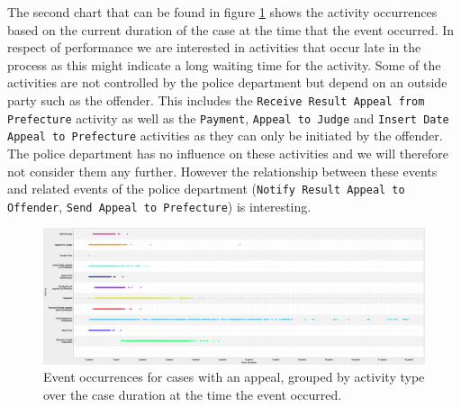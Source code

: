 \documentclass[12pt]{report}
\begin{document}
The second chart that can be found in figure \ref{fig:dotted_duration_appeals} shows the activity occurrences based on the current duration of the case at the time that the event occurred. In respect of performance we are interested in activities that occur late in the process as this might indicate a long waiting time for the activity. Some of the activities are not controlled by the police department but depend on an outside party such as the offender. This includes the \texttt{Receive Result Appeal from Prefecture} activity as well as the \texttt{Payment}, \texttt{Appeal to Judge} and \texttt{Insert Date Appeal to Prefecture} activities as they can only be initiated by the offender. The police department has no influence on these activities and we will therefore not consider them any further. However the relationship between these events and related events of the police department (\texttt{Notify Result Appeal to Offender}, \texttt{Send Appeal to Prefecture}) is interesting.
\begin{figure}[H]
  \centering
  \includegraphics[width=\textwidth]{figures/dotted_duration_appeals.png}
  \caption{Event occurrences for cases with an appeal, grouped by activity type over the case duration at the time the event occurred.}
  \label{fig:dotted_duration_appeals}
\end{figure}
\end{document}
